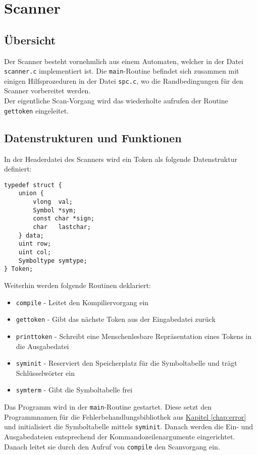 \chapter{Scanner}
\label{chap:scanner}

\section{Übersicht}
\label{sec:scanner_overview}
Der Scanner besteht vornehmlich aus einem Automaten,
welcher in der Datei \texttt{scanner.c} implementiert ist.
Die \texttt{main}-Routine befindet sich zusammen mit einigen Hilfsprozeduren in der Datei \texttt{spc.c},
wo die Randbedingungen für den Scanner vorbereitet werden. \\
Der eigentliche Scan-Vorgang wird das wiederholte aufrufen der Routine \texttt{gettoken} eingeleitet.

\section{Datenstrukturen und Funktionen}
\label{sec:scanner_datafunc}

In der Headerdatei des Scanners wird ein Token als folgende Datenstruktur definiert:

\begin{lstlisting}
typedef struct {
	union {
		vlong  val;
		Symbol *sym;
		const char *sign;
		char   lastchar;
	} data;
	uint row;
	uint col;
	Symboltype symtype;
} Token;
\end{lstlisting}

Weiterhin werden folgende Routinen deklariert:

\begin{itemize}
\item \texttt{compile} - Leitet den Kompiliervorgang ein
\item \texttt{gettoken} - Gibt das nächste Token aus der Eingabedatei zurück
\item \texttt{printtoken} - Schreibt eine Menschenlesbare Repräsentation eines Tokens in die Ausgabedatei
\item \texttt{syminit} - Reserviert den Speicherplatz für die Symboltabelle und trägt Schlüsselwörter ein
\item \texttt{symterm} - Gibt die Symboltabelle frei
\end{itemize}

Das Programm wird in der \texttt{main}-Routine gestartet.
Diese setzt den Programmnamen für die Fehlerbehandlungsbibliothek aus \hyperref[chap:error]{Kapitel \ref{chap:error}}
und initialisiert die Symboltabelle mittels \texttt{syminit}.
Danach werden die Ein- und Ausgabedateien entsprechend der Kommandozeilenargumente eingerichtet.
Danach leitet sie durch den Aufruf von \texttt{compile} den Scanvorgang ein.

